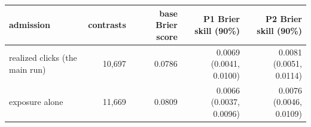 \begin{tabular}{lrrrr}
\toprule
admission & contrasts & base Brier score & P1 Brier skill (90\%) & P2 Brier skill (90\%) \\
\midrule
realized clicks (the main run) & 10,697 & 0.0786 & 0.0069 (0.0041, 0.0100) & 0.0081 (0.0051, 0.0114) \\
exposure alone & 11,669 & 0.0809 & 0.0066 (0.0037, 0.0096) & 0.0076 (0.0046, 0.0109) \\
\bottomrule
\end{tabular}
